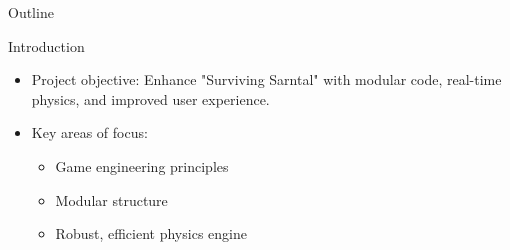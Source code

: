 \begin{frame}{Outline}
    \tableofcontents
\end{frame}


\begin{frame}{Introduction}
    \begin{itemize}
        \item Project objective: Enhance "Surviving Sarntal" with modular code, real-time physics, and improved user experience.
        \item Key areas of focus:
        \begin{itemize}
            \item Game engineering principles
            \item Modular structure
            \item Robust, efficient physics engine
        \end{itemize}
    \end{itemize}
\end{frame}